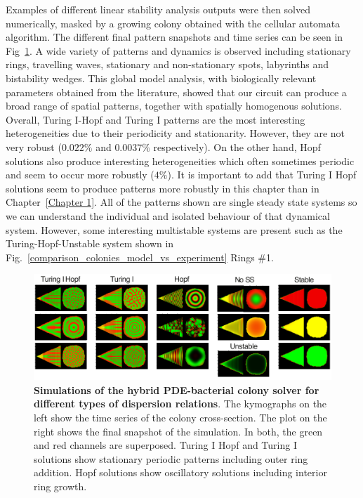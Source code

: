 Examples of different linear stability analysis outputs were then solved numerically, masked by a growing colony obtained with the cellular automata algorithm.
The different final pattern snapshots and time series can be seen in Fig~\ref{system_class_simulations}.
A wide variety of patterns and dynamics is observed including stationary rings, travelling waves, stationary and non-stationary spots, labyrinths and bistability wedges.
This global model analysis, with biologically relevant parameters obtained from the literature, showed that our circuit can produce a broad range of spatial patterns, together with spatially homogenous solutions.
Overall, Turing I-Hopf and Turing I patterns are the most interesting heterogeneities due to their periodicity and stationarity.
However, they are not very robust ($0.022\%$ and $0.0037\%$ respectively).
On the other hand, Hopf solutions also produce interesting heterogeneities which often sometimes periodic and seem to occur more robustly ($4\%$).
It is important to add that Turing I Hopf solutions seem to produce patterns more robustly in this chapter than in Chapter~\ref{Chapter 1}.
All of the patterns shown are single steady state systems so we can understand the individual and isolated behaviour of that dynamical system.
However, some interesting multistable systems are present such as the Turing-Hopf-Unstable system shown in Fig.~\ref{comparison_colonies_model_vs_experiment} Rings \#1.
\begin{figure}[H]
    \centering

    \includegraphics[width=1\textwidth]{chapters/Chapter 3/system_class_simulations}
    \caption{\textbf{Simulations of the hybrid PDE-bacterial colony solver for different types of dispersion relations}. The kymographs on the left show the time series of the colony cross-section. The plot on the right shows the final snapshot of the simulation. In both, the green and red channels are superposed. Turing I Hopf and Turing I solutions show stationary periodic patterns including outer ring addition. Hopf solutions show oscillatory solutions including interior ring growth.}
    \label{system_class_simulations}
\end{figure}



